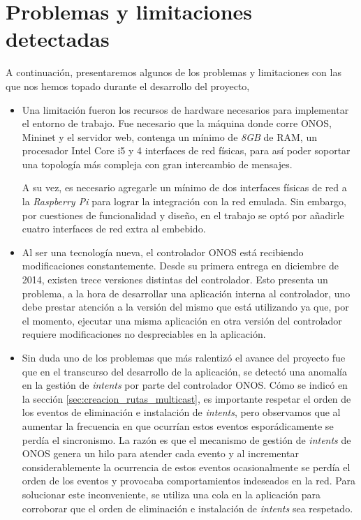 \section{Problemas y limitaciones detectadas} \label{problemasylimi}

A continuación, presentaremos algunos de los problemas y limitaciones con las que nos hemos topado durante el desarrollo del proyecto,

\begin{itemize}
    \item Una limitación fueron los recursos de hardware necesarios para implementar el entorno de trabajo. Fue necesario que la máquina donde corre ONOS, Mininet y el servidor web, contenga un mínimo de \textit{8GB} de RAM, un procesador Intel Core i5 y 4 interfaces de red físicas, para así poder soportar una topología más compleja con gran intercambio de mensajes.  
    
    A su vez, es necesario agregarle un mínimo de dos interfaces físicas de red a la \textit{Raspberry Pi} para lograr la integración con la red emulada. Sin embargo, por cuestiones de funcionalidad y diseño, en el trabajo se optó por añadirle cuatro interfaces de red extra al embebido.
    
    \item Al ser una tecnología nueva, el controlador ONOS está recibiendo modificaciones constantemente. Desde su primera entrega en diciembre de 2014, existen trece versiones distintas del controlador. Esto presenta un problema, a la hora de desarrollar una aplicación interna al controlador, uno debe prestar atención a la versión del mismo que está utilizando ya que, por el momento, ejecutar una misma aplicación en otra versión del controlador requiere modificaciones no despreciables en la aplicación.     
    
    \item Sin duda uno de los problemas que más ralentizó el avance del proyecto fue que en el transcurso del desarrollo de la aplicación, se detectó una anomalía en la gestión de \textit{intents} por parte del controlador ONOS. Cómo se indicó en la sección \ref{sec:creacion_rutas_multicast}, es importante respetar el orden de los eventos de eliminación e instalación de \textit{intents}, pero observamos que al aumentar la frecuencia en que ocurrían estos eventos esporádicamente se perdía el sincronismo. La razón es que el mecanismo de gestión de \textit{intents} de ONOS genera un hilo para atender cada evento y al incrementar considerablemente la ocurrencia de estos eventos ocasionalmente se perdía el orden de los eventos y provocaba comportamientos indeseados en la red. Para solucionar este inconveniente, se utiliza una cola en la aplicación para corroborar que el orden de eliminación e instalación de \textit{intents} sea respetado.    


\end{itemize}
